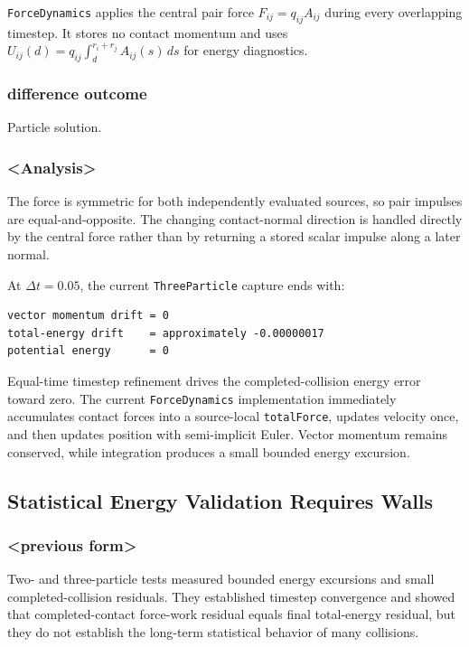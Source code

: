 \texttt{ForceDynamics} applies the central pair force
\(F_{ij}=q_{ij}A_{ij}\) during every overlapping timestep.  It stores no
contact momentum and uses
\(U_{ij}(d)=q_{ij}\int_d^{r_i+r_j}A_{ij}(s)\,ds\) for energy diagnostics.

\subsubsection{difference outcome}

Particle solution.

\subsubsection{<Analysis>}

The force is symmetric for both independently evaluated sources, so pair
impulses are equal-and-opposite.  The changing contact-normal direction is
handled directly by the central force rather than by returning a stored scalar
impulse along a later normal.

At \(\Delta t=0.05\), the current \texttt{ThreeParticle} capture ends with:

\begin{verbatim}
vector momentum drift = 0
total-energy drift    = approximately -0.00000017
potential energy      = 0
\end{verbatim}

Equal-time timestep refinement drives the completed-collision energy error
toward zero.  The current \texttt{ForceDynamics} implementation immediately
accumulates contact forces into a source-local \texttt{totalForce}, updates
velocity once, and then updates position with semi-implicit Euler.  Vector
momentum remains conserved, while integration produces a small bounded energy
excursion.

\subsection{Statistical Energy Validation Requires Walls}

\subsubsection{<previous form>}

Two- and three-particle tests measured bounded energy excursions and small
completed-collision residuals.  They established timestep convergence and
showed that completed-contact force-work residual equals final total-energy
residual, but they do not establish the long-term statistical behavior of many
collisions.

